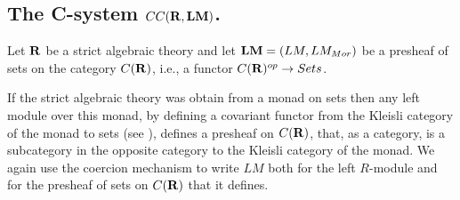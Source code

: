 \documentclass[11pt]{article}
\newcommand{\sr}{\rightarrow}
\newcommand{\rr}{{\bf R}}
\newcommand{\lm}{{\bf LM}}
\begin{document}
\subsection{The C-system $CC(\rr,\lm)$.}
%
Let $\rr$ be a strict algebraic theory and let $\lm=(LM,LM_{Mor})$ be a presheaf of sets on the category $C(\rr)$, i.e., a functor $C(\rr)^{op}\sr Sets$. 

If the strict algebraic theory was obtain from a monad on sets then any left module over this monad, by defining a covariant functor from the Kleisli category of the monad to sets (see \cite[Prop. 5]{HM2010}), defines a presheaf  on $C(\rr)$, that, as a category, is a subcategory in the opposite category to the Kleisli category of the monad. We again use the coercion mechanism to write $LM$ both for the left $R$-module and for the presheaf of sets on $C(\rr)$ that it defines. 
\end{document}
